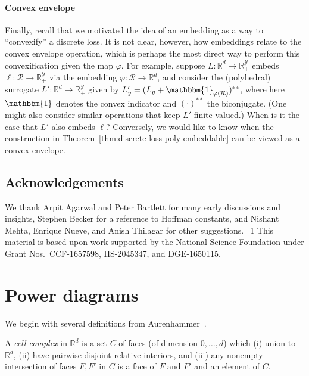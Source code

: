 \documentclass[twoside,11pt]{article}
\newcommand{\Comments}{1}
\newcommand{\mytodo}[2]{\ifnum\Comments=1%
  \todo[linecolor=#1!80!black,backgroundcolor=#1,bordercolor=#1!80!black]{#2}\fi}
\newcommand{\raft}[1]{\mytodo{green!20!white}{RF: #1}}
\newcommand{\reals}{\mathbb{R}}
\newcommand{\R}{\mathcal{R}}
\newcommand{\Y}{\mathcal{Y}}
\newcommand{\ones}{\mathbbm{1}}
\begin{document}
\paragraph{Convex envelope}

Finally, recall that we motivated the idea of an embedding as a way to ``convexify'' a discrete loss.
It is not clear, however, how embeddings relate to the convex envelope operation, which is perhaps the most direct way to perform this convexification given the map $\varphi$.
For example, suppose $L:\reals^d\to\reals^\Y_+$ embeds $\ell:\R\to\reals^\Y_+$ via the embedding $\varphi:\R\to\reals^d$, and consider the (polyhedral) surrogate $L':\reals^d\to\reals^\Y_+$ given by $L'_y = (L_y + \ones_{\varphi(\R)})^{**}$, where here $\ones$ denotes the convex indicator and $(\cdot)^{**}$ the biconjugate.
(One might also consider similar operations that keep $L'$ finite-valued.)
When is it the case that $L'$ also embeds $\ell$?
Conversely, we would like to know when the construction in Theorem~\ref{thm:discrete-loss-poly-embeddable} can be viewed as a convex envelope.


\subsection*{Acknowledgements}
We thank Arpit Agarwal and Peter Bartlett for many early discussions and insights,
Stephen Becker for a reference to Hoffman constants,
and Nishant Mehta, Enrique Nueve, and Anish Thilagar for other suggestions.\raft{others?}
This material is based upon work supported by the National Science Foundation under Grant Nos.\ CCF-1657598, IIS-2045347, and DGE-1650115.





\appendix

\section{Power diagrams}\label{app:power-diagrams}
We begin with several definitions from Aurenhammer~\cite{aurenhammer1987power}.
\begin{definition}\label{def:cell-complex}
  A \emph{cell complex} in $\reals^d$ is a set $C$ of faces (of dimension $0,\ldots,d$) which (i) union to $\reals^d$, (ii) have pairwise disjoint relative interiors, and (iii) any nonempty intersection of faces $F,F'$ in $C$ is a face of $F$ and $F'$ and an element of $C$.
\end{definition}
\end{document}
